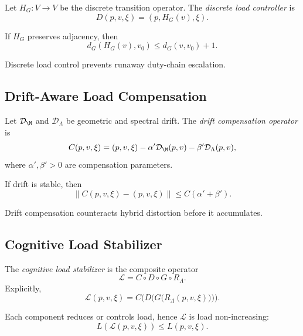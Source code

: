 \begin{definition}
Let $H_G : V \to V$ be the discrete transition operator.  
The \emph{discrete load controller} is
\[
D(p,v,\xi)
= (p, H_G(v), \xi).
\]
\end{definition}

\begin{lemma}
If $H_G$ preserves adjacency, then
\[
d_G(H_G(v), v_0) \le d_G(v, v_0) + 1.
\]
\end{lemma}

\begin{remark}
Discrete load control prevents runaway duty-chain escalation.
\end{remark}

\subsection{Drift-Aware Load Compensation}

\begin{definition}
Let $\mathcal{D}_\M$ and $\mathcal{D}_\Lambda$ be geometric and spectral drift.
The \emph{drift compensation operator} is
\[
C(p,v,\xi)
= (p, v, \xi)
- \alpha' \mathcal{D}_\M(p,v)
- \beta' \mathcal{D}_\Lambda(p,v),
\]
where $\alpha',\beta' > 0$ are compensation parameters.
\end{definition}

\begin{lemma}
If drift is stable, then
\[
\| C(p,v,\xi) - (p,v,\xi) \|
\le C(\alpha' + \beta').
\]
\end{lemma}

\begin{remark}
Drift compensation counteracts hybrid distortion before it accumulates.
\end{remark}

\subsection{Cognitive Load Stabilizer}

\begin{definition}
The \emph{cognitive load stabilizer} is the composite operator
\[
\mathcal{L}
= C \circ D \circ G \circ R_\Lambda.
\]
Explicitly,
\[
\mathcal{L}(p,v,\xi)
= C\big( D\big( G\big( R_\Lambda(p,v,\xi) \big) \big) \big).
\]
\end{definition}

\begin{lemma}
Each component reduces or controls load, hence $\mathcal{L}$ is load
non-increasing:
\[
L(\mathcal{L}(p,v,\xi)) \le L(p,v,\xi).
\]
\end{lemma}

